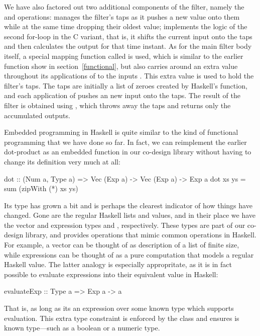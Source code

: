 \documentclass[../main.tex]{subfiles}
\begin{document}
\noindent We have also factored out two additional components of the filter, namely the  and  operations:  manages the filter's taps as it pushes a new value onto them while at the same time dropping their oldest value;  implements the logic of the second for-loop in the C variant, that is, it shifts the current input onto the taps and then calculates the output for that time instant. As for the main filter body itself, a special mapping function called  is used, which is similar to the earlier  function show in section~\ref{functional}, but also carries around an extra value throughout its applications of  to the inputs . This extra value is used to hold the filter's taps. The taps are initially a list of zeroes created by Haskell's  function, and each application of  pushes an new input onto the taps. The result of the filter is obtained using , which throws away the taps and returns only the accumulated outputs.

Embedded programming in Haskell is quite similar to the kind of functional programming that we have done so far. In fact, we can reimplement the earlier dot-product as an embedded function in our co-design library without having to change its definition very much at all:

\begin{code}
dot :: (Num a, Type a) => Vec (Exp a) -> Vec (Exp a) -> Exp a
dot xs ys = sum (zipWith (*) xs ys)
\end{code}

\noindent Its type has grown a bit and is perhaps the clearest indicator of how things have changed. Gone are the regular Haskell lists and values, and in their place we have the vector and expression types  and , respectively. These types are part of our co-design library, and provides operations that mimic common operations in Haskell. For example, a vector can be thought of as description of a list of finite size, while expressions can be thought of as a pure computation that models a regular Haskell value. The latter analogy is especially appropritate, as it is in fact possible to evaluate expressions into their equivalent value in Haskell:

\begin{code}
evaluateExp :: Type a => Exp a -> a
\end{code}

\noindent That is, as long as its an expression over some known type  which supports evaluation. This extra type constraint is enforced by the  class and ensures  is known type---such as a boolean or a numeric type.
\end{document}
